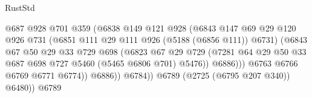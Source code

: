\begin{lexlean}{RustStd}
\begin{coremodule}
                                          @687
                                          @928
                                          @701
                                          @359
                                          (@6838
                                            @149
                                            @121
                                            @928
                                            (@6843
                                              @147
                                              @69
                                              @29
                                              @120
                                              @926
                                              @731
                                              (@6851 @111 @29 @111 @926 (@5188 (@6856 @111)) @6731)
                                              (@6843
                                                @67
                                                @50
                                                @29
                                                @33
                                                @729
                                                @698
                                                (@6823
                                                  @67
                                                  @29
                                                  @729
                                                  (@7281
                                                    @64
                                                    @29
                                                    @50
                                                    @33
                                                    @687
                                                    @698
                                                    @727
                                                    @5460
                                                    (@5465 @6806 @701)
                                                    @5476))
                                                @6886)))
                                          @6763
                                          @6766
                                          @6769
                                          @6771
                                          @6774))
                                      @6886))
                                  @6784))
                              @6789
                              (@2725 (@6795 @207 @340))
                              @6480))
                          @6789

\end{coremodule}
\end{lexlean}
